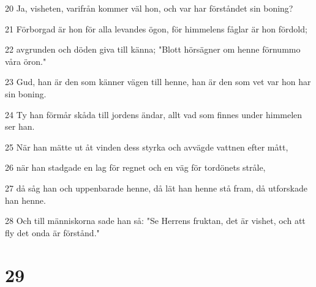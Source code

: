 \par 20 Ja, visheten, varifrån kommer väl hon, och var har förståndet sin boning?
\par 21 Förborgad är hon för alla levandes ögon, för himmelens fåglar är hon fördold;
\par 22 avgrunden och döden giva till känna; "Blott hörsägner om henne förnummo våra öron."
\par 23 Gud, han är den som känner vägen till henne, han är den som vet var hon har sin boning.
\par 24 Ty han förmår skåda till jordens ändar, allt vad som finnes under himmelen ser han.
\par 25 När han mätte ut åt vinden dess styrka och avvägde vattnen efter mått,
\par 26 när han stadgade en lag för regnet och en väg för tordönets stråle,
\par 27 då såg han och uppenbarade henne, då lät han henne stå fram, då utforskade han henne.
\par 28 Och till människorna sade han så: "Se Herrens fruktan, det är vishet, och att fly det onda är förstånd."

\chapter{29}


